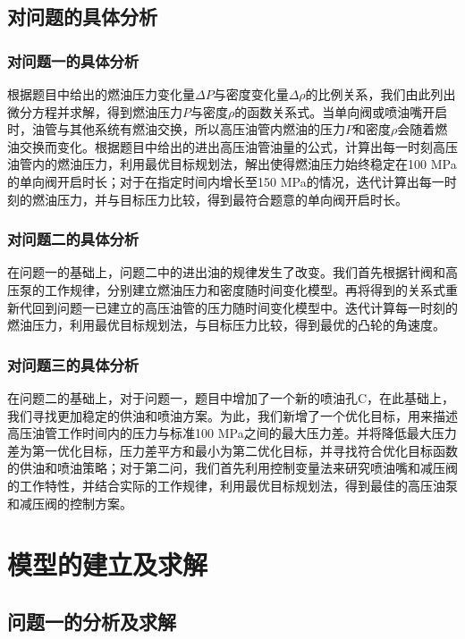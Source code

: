 \documentclass[withoutpreface,bwprint]{cumcmthesis} %
\begin{document}
\subsection{对问题的具体分析}
\subsubsection{对问题一的具体分析}

根据题目中给出的燃油压力变化量$\Delta P$与密度变化量$\Delta \rho$的比例关系，我们由此列出微分方程并求解，得到燃油压力$P$与密度$\rho$的函数关系式。当单向阀或喷油嘴开启时，油管与其他系统有燃油交换，所以高压油管内燃油的压力$P$和密度$\rho$会随着燃油交换而变化。根据题目中给出的进出高压油管油量的公式，计算出每一时刻高压油管内的燃油压力，利用最优目标规划法，解出使得燃油压力始终稳定在100 MPa的单向阀开启时长；对于在指定时间内增长至150 MPa的情况，迭代计算出每一时刻的燃油压力，并与目标压力比较，得到最符合题意的单向阀开启时长。

\subsubsection{对问题二的具体分析}

在问题一的基础上，问题二中的进出油的规律发生了改变。我们首先根据针阀和高压泵的工作规律，分别建立燃油压力和密度随时间变化模型。再将得到的关系式重新代回到问题一已建立的高压油管的压力随时间变化模型中。迭代计算每一时刻的燃油压力，利用最优目标规划法，与目标压力比较，得到最优的凸轮的角速度。

\subsubsection{对问题三的具体分析}
在问题二的基础上，对于问题一，题目中增加了一个新的喷油孔C，在此基础上，我们寻找更加稳定的供油和喷油方案。为此，我们新增了一个优化目标，用来描述高压油管工作时间内的压力与标准100 MPa之间的最大压力差。并将降低最大压力差为第一优化目标，压力差平方和最小为第二优化目标，并寻找符合优化目标函数的供油和喷油策略；对于第二问，我们首先利用控制变量法来研究喷油嘴和减压阀的工作特性，并结合实际的工作规律，利用最优目标规划法，得到最佳的高压油泵和减压阀的控制方案。

\section{模型的建立及求解}
\subsection{问题一的分析及求解}
\end{document}
